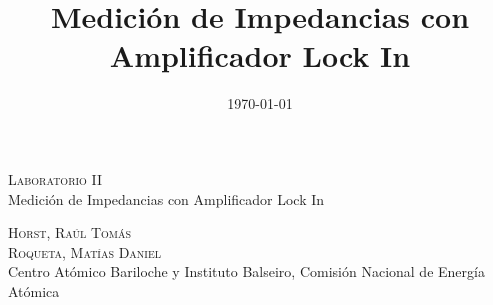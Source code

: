 \documentclass[11pt,a4paper]{extarticle}
\date{\small{\today}}
\begin{document}
\title{Medición de Impedancias con Amplificador Lock In}
	\LARGE{\textsc{Laboratorio II}}\\
	\Large{Medición de Impedancias con Amplificador Lock In}\\
\begin{large}
\small\textsc{Horst, Raúl Tomás}\\
\small\textsc{Roqueta, Matías Daniel}\\
\small{Centro Atómico Bariloche y Instituto Balseiro, Comisión Nacional de Energía Atómica}\\
\end{large}
\setcounter{page}{1}

\chead{}

\rfoot{\thepage} 
\renewcommand{\headrulewidth}{0.4pt} 
\renewcommand{\footrulewidth}{0.4pt} 
\pagestyle{fancy}
\end{document}
